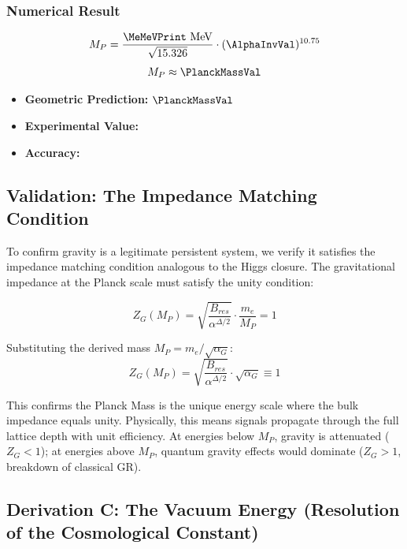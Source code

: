 \subsubsection{Numerical Result}
\begin{equation}
M_P = \frac{\MeMeVPrint \text{ MeV}}{\sqrt{15.326}} \cdot (\AlphaInvVal)^{10.75}
\end{equation}
\begin{equation}
M_P \approx \mathbf{\PlanckMassVal}
\end{equation}

\begin{itemize}
    \item \textbf{Geometric Prediction:} $\PlanckMassVal$
    \item \textbf{Experimental Value:} \PlanckMassExperimentalValue
    \item \textbf{Accuracy:} \PlanckMassAccText
\end{itemize}

\subsection{Validation: The Impedance Matching Condition}
To confirm gravity is a legitimate persistent system, we verify it satisfies the impedance matching condition analogous to the Higgs closure. The gravitational impedance at the Planck scale must satisfy the unity condition:

\begin{equation}
Z_G(M_P) = \sqrt{\frac{B_{res}}{\alpha^{\Delta/2}}} \cdot \frac{m_e}{M_P} = 1
\end{equation}

Substituting the derived mass $M_P = m_e / \sqrt{\alpha_G}$:
\begin{equation}
Z_G(M_P) = \sqrt{\frac{B_{res}}{\alpha^{\Delta/2}}} \cdot \sqrt{\alpha_G} \equiv 1
\end{equation}

This confirms the Planck Mass is the unique energy scale where the bulk impedance equals unity. Physically, this means signals propagate through the full lattice depth with unit efficiency. At energies below $M_P$, gravity is attenuated ($Z_G < 1$); at energies above $M_P$, quantum gravity effects would dominate ($Z_G > 1$, breakdown of classical GR).
\subsection{Derivation C: The Vacuum Energy (Resolution of the Cosmological Constant)}
\label{sec:vacuum_energy}

